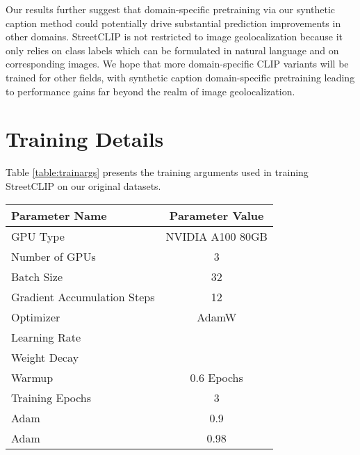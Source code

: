 \documentclass{article}
\begin{document}
Our results further suggest that domain-specific pretraining via our synthetic caption method could potentially drive substantial prediction improvements in other domains. StreetCLIP is not restricted to image geolocalization because it only relies on class labels which can be formulated in natural language and on corresponding images. We hope that more domain-specific CLIP variants will be trained for other fields, with synthetic caption domain-specific pretraining leading to performance gains far beyond the realm of image geolocalization.


  












\newpage
\appendix

\section{Training Details}
\label{app:training}

Table \ref{table:trainargs} presents the training arguments used in training StreetCLIP on our original datasets.

\begin{table*}[htb]
\caption{Domain-Specific Pretraining Parameters for StreetCLIP}
\label{table:trainargs}
\vskip 0.15in
\begin{center}
\begin{small}
\begin{sc}
\begin{tabular}{lc}
\toprule
\textbf{Parameter Name} & \textbf{Parameter Value} \\
\midrule
GPU Type & NVIDIA A100 80GB\\
Number of GPUs & 3\\
Batch Size & 32\\
Gradient Accumulation Steps & 12\\
Optimizer & AdamW\\
Learning Rate & \\
Weight Decay & \\
Warmup & 0.6 Epochs\\
Training Epochs & 3\\
Adam  & 0.9\\
Adam  & 0.98\\
\bottomrule
\end{tabular}
\end{sc}
\end{small}
\end{center}
\vskip -0.1in
\end{table*}
\end{document}
